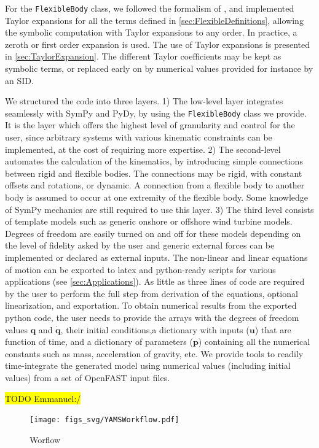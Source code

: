 \documentclass[wes, manuscript]{copernicus}
\renewcommand{\v}[1]{\boldsymbol{#1}}
\newcommand{\todoEmmanuel}[1]{{\colorbox{yellow}{TODO Emmanuel:}}{\color{red}{#1}}\colorbox{yellow}{/}}
\begin{document}
For the \texttt{FlexibleBody} class, we followed the formalism of \cite{Wallrapp:1994}, and implemented Taylor expansions for all the terms defined in \autoref{sec:FlexibleDefinitions}, allowing the symbolic computation with Taylor expansions to any order.
In practice, a zeroth or first order expansion is used.
The use of Taylor expansions is presented in \autoref{sec:TaylorExpansion}. 
The different Taylor coefficients may be kept as symbolic terms, or replaced early on by numerical values provided for instance by an SID. 

We structured the code into three layers.
1) The low-level layer integrates seamlessly with SymPy and PyDy, by using the \texttt{FlexibleBody} class we provide.
It is the layer which offers the highest level of granularity and control for the user, since arbitrary systems with various kinematic constraints can be implemented, at the cost of requiring more expertise.
2) The second-level automates the calculation of the kinematics, by introducing simple connections between rigid and flexible bodies.
The connections may be rigid, with constant offsets and rotations, or dynamic.
A connection from a flexible body to another body is assumed to occur at one extremity of the flexible body.
Some knowledge of SymPy mechanics are still required to use this layer.
3) The third level consists of template models such as generic onshore or offshore wind turbine models.
Degrees of freedom are easily turned on and off for these models depending on the level of fidelity asked by the user and generic external forces can be implemented or declared as external inputs.
The non-linear and linear equations of motion can be exported to latex and python-ready scripts for various applications (see \autoref{sec:Applications}).
As little as three lines of code are required by the user to perform the full step from derivation of the equations, optional linearization, and exportation.
To obtain numerical results from the exported python code, the user needs to provide the arrays with the degrees of freedom values $\v{q}$ and $\v{\dot{q}}$, their initial conditions,a dictionary with inputs ($\v{u}$) that are function of time, and a dictionary of parameters ($\v{p}$) containing all the numerical constants such as mass, acceleration of gravity, etc.
We provide tools to readily time-integrate the generated model using numerical values (including initial values) from a set of OpenFAST input files.

\todoEmmanuel{Mention a bit more about the framework. Update the sketch below illustrating. Describe the workflow. Ggetting a SID, or dictionary from input files. Getting a source code from the framework.}
\noindent\begin{figure}[!htb]\centering%
  \texttt{[image: figs\_svg/YAMSWorkflow.pdf]}
  \caption{Worflow}\label{fig:YAMSWorkflow}%
\end{figure}
\end{document}
